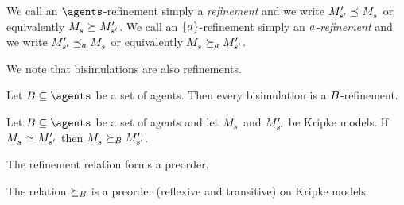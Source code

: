 We call an $\agents$-refinement simply a {\em refinement} and we write $\kPModelP{\kStateSP} \refines \kPModel{\kStateS}$ or equivalently $\kPModel{\kStateS} \simulates \kPModelP{\kStateSP}$.
We call an $\{a\}$-refinement simply an {\em $a$-refinement} and we write $\kPModelP{\kStateSP} \refinesA \kPModel{\kStateS}$ or equivalently $\kPModel{\kStateS} \simulatesA \kPModelP{\kStateSP}$.

We note that bisimulations are also refinements.

\begin{proposition}\label{bisimulation-refinement}
Let $\agentsB \subseteq \agents$ be a set of agents. Then every bisimulation is a $B$-refinement.
\end{proposition}

\begin{corollary}\label{bisimilar-refinement}
Let $\agentsB \subseteq \agents$ be a set of agents and let $\kPModel{\kStateS}$ and ${M^{\prime}_{{s}^{\prime}}}$ be Kripke models.
If $\kPModel{\kStateS} \bisimilar \kPModelP{\kStateSP}$ then $\kPModel{\kStateS} \simulatesBs \kPModelP{\kStateSP}$.
\end{corollary}

The refinement relation forms a preorder.

\begin{proposition}\label{refinements-preorder}
The relation $\succeq_{B}$ is a preorder (reflexive and transitive) on Kripke models.
\end{proposition}

